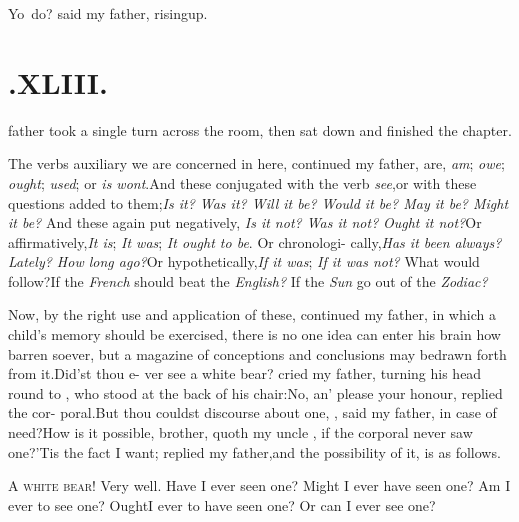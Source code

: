 \documentclass[twoside]{article}
\begin{document}
\tsh  Yo\sic\ do? said my father,
rising\break up.

\section{.\enspace  XLIII.}

 father took a single turn across
the room, then sat down and finished the chapter.

The verbs auxiliary we are concerned in here, continued my
father, are, \textit{am};
\textit{owe}; \textit{ought}; \textit{used}; or
\textit{is wont}.\tsk And these 
conjugated with the verb
\textit{see},\tsk or with these questions added to
them;\tsk \textit{Is it? Was it? Will it
be? Would it be? May\break 
it be? Might it be?} And these again\break
put negatively, \textit{Is it not? Was it not?}\break
\textit{Ought it not?}\tsk Or affirmatively,\tsk \textit{It is};\break
\textit{It was}; \textit{It ought to be}. Or chronologi-\break
cally,\tsk \textit{Has it been always? Lately?\break
How long ago?}\tsk Or hypothetically,\tsk \textit{If\break
it was}; \textit{If it was not?} What would\break
follow?\tsh If the \textit{French} should beat\break
the \textit{English?} If the \textit{Sun} go out of the\break
\textit{Zodiac?}

Now, by the right use and application of these, continued my
father, in which a child’s memory should be exercised, there
is no one idea can enter his brain how barren soever, but a
magazine of conceptions and conclusions may be\break drawn forth from
it.\tsh Did’st thou e-\break 
ver see a white bear? cried my father,\break
turning his head round to \trim, who\break 
stood at the back of his chair:\tsk No,\break
an’ please your honour, replied the cor-\break
poral.\tsh But thou couldst discourse\break
about one, \trim, said my father, in\break
case of need?\tsh How is it possible,\break
brother, quoth my uncle \toby, if the\break
corporal never saw one?\tsh ’Tis the\break
fact I want; replied my father,\tsk and\break
the possibility of it, is as follows.

A \textsc{white bear}! Very well.  Have\break
I ever seen one? Might I ever have seen
one? Am I ever to see one? Ought\break I ever
to have seen one? Or can I ever see one?
\end{document}
